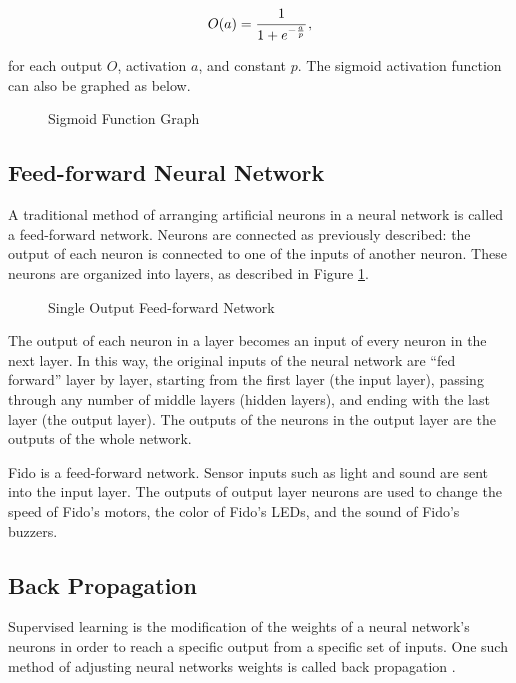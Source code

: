 \begin{equation}
	O(a) = \cfrac{1}{1+e^{-\frac{a}{p}}}
	\,,
\end{equation}

\noindent for each output $O$, activation $a$, and constant $p$. The sigmoid activation function can also be graphed as below.

\begin{figure}[ht]
	\centering
	
	\caption{Sigmoid Function Graph}
\end{figure}

\subsection{Feed-forward Neural Network}

A traditional method of arranging artificial neurons in a neural network is called a feed-forward network. Neurons are connected as previously described: the output of each neuron is connected to one of the inputs of another neuron. These neurons are organized into layers, as described in Figure \ref{fig:feedforward}.

\begin{figure}[ht]
	\centering
	
	\caption{Single Output Feed-forward Network}
	\label{fig:feedforward}
\end{figure}

The output of each neuron in a layer becomes an input of every neuron in the next layer. In this way, the original inputs of the neural network are ``fed forward'' layer by layer, starting from the first layer (the input layer), passing through any number of middle layers (hidden layers), and ending with the last layer (the output layer). The outputs of the neurons in the output layer are the outputs of the whole network.

Fido is a feed-forward network. Sensor inputs such as light and sound are sent into the input layer. The outputs of output layer neurons are used to change the speed of Fido's motors, the color of Fido's LEDs, and the sound of Fido's buzzers.

\subsection{Back Propagation}

Supervised learning is the modification of the weights of a neural network's neurons in order to reach a specific output from a specific set of inputs. One such method of adjusting neural networks weights is called back propagation \cite{werbos}.

